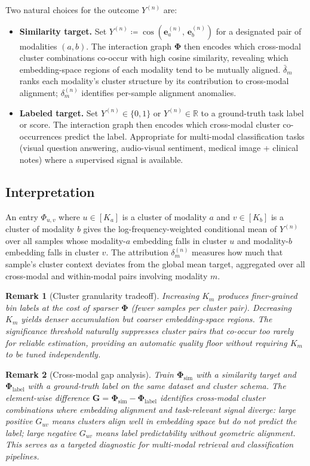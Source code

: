 \documentclass[11pt]{article}
\newtheorem{remark}{Remark}
\begin{document}
Two natural choices for the outcome $Y^{(n)}$ are:
\begin{itemize}
  \item \textbf{Similarity target.}
    Set $Y^{(n)} \coloneqq \cos(\bm{e}_a^{(n)},\, \bm{e}_b^{(n)})$ for a designated pair of modalities $(a,b)$.
    The interaction graph $\bm{\Phi}$ then encodes which cross-modal cluster combinations co-occur with high cosine similarity, revealing which embedding-space regions of each modality tend to be mutually aligned.
    $\bar{\delta}_m$ ranks each modality's cluster structure by its contribution to cross-modal alignment; $\delta_m^{(n)}$ identifies per-sample alignment anomalies.
  \item \textbf{Labeled target.}
    Set $Y^{(n)} \in \{0,1\}$ or $Y^{(n)} \in \mathbb{R}$ to a ground-truth task label or score.
    The interaction graph then encodes which cross-modal cluster co-occurrences predict the label.
    Appropriate for multi-modal classification tasks (visual question answering, audio-visual sentiment, medical image + clinical notes) where a supervised signal is available.
\end{itemize}

\subsection{Interpretation}

An entry $\Phi_{u,v}$ where $u \in [K_a]$ is a cluster of modality $a$ and $v \in [K_b]$ is a cluster of modality $b$ gives the log-frequency-weighted conditional mean of $Y^{(n)}$ over all samples whose modality-$a$ embedding falls in cluster $u$ and modality-$b$ embedding falls in cluster $v$.
The attribution $\delta_m^{(n)}$ measures how much that sample's cluster context deviates from the global mean target, aggregated over all cross-modal and within-modal pairs involving modality $m$.

\begin{remark}[Cluster granularity tradeoff]
Increasing $K_m$ produces finer-grained bin labels at the cost of sparser $\bm{\Phi}$ (fewer samples per cluster pair).
Decreasing $K_m$ yields denser accumulation but coarser embedding-space regions.
The significance threshold naturally suppresses cluster pairs that co-occur too rarely for reliable estimation, providing an automatic quality floor without requiring $K_m$ to be tuned independently.
\end{remark}

\begin{remark}[Cross-modal gap analysis]
Train $\bm{\Phi}_{\mathrm{sim}}$ with a similarity target and $\bm{\Phi}_{\mathrm{label}}$ with a ground-truth label on the same dataset and cluster schema.
The element-wise difference $\bm{G} = \bm{\Phi}_{\mathrm{sim}} - \bm{\Phi}_{\mathrm{label}}$ identifies cross-modal cluster combinations where embedding alignment and task-relevant signal diverge: large positive $G_{uv}$ means clusters align well in embedding space but do not predict the label; large negative $G_{uv}$ means label predictability without geometric alignment.
This serves as a targeted diagnostic for multi-modal retrieval and classification pipelines.
\end{remark}
\end{document}
